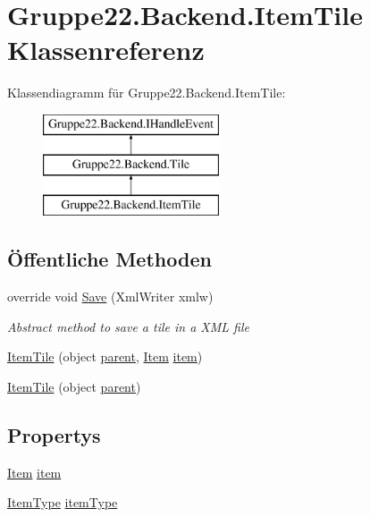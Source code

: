 \hypertarget{class_gruppe22_1_1_backend_1_1_item_tile}{\section{Gruppe22.\-Backend.\-Item\-Tile Klassenreferenz}
\label{class_gruppe22_1_1_backend_1_1_item_tile}
}
Klassendiagramm für Gruppe22.\-Backend.\-Item\-Tile\-:\begin{figure}[H]
\begin{center}
\leavevmode
\includegraphics[height=3.000000cm]{class_gruppe22_1_1_backend_1_1_item_tile}
\end{center}
\end{figure}
\subsection*{Öffentliche Methoden}
\begin{DoxyCompactItemize}
\item 
override void \hyperlink{class_gruppe22_1_1_backend_1_1_item_tile_a2e58e18ae35c42b311fcdaa1664ec505}{Save} (Xml\-Writer xmlw)
\begin{DoxyCompactList}\small\item\em Abstract method to save a tile in a X\-M\-L file \end{DoxyCompactList}\item 
\hyperlink{class_gruppe22_1_1_backend_1_1_item_tile_a7975720b4b34cb910403f8ead9caae56}{Item\-Tile} (object \hyperlink{class_gruppe22_1_1_backend_1_1_tile_abc12933c70eb3a2ebbb2fde9f45c2632}{parent}, \hyperlink{class_gruppe22_1_1_backend_1_1_item}{Item} \hyperlink{class_gruppe22_1_1_backend_1_1_item_tile_a1c70024d6768af2fbeeb988fc14838be}{item})
\item 
\hyperlink{class_gruppe22_1_1_backend_1_1_item_tile_a0fd464405cb497015bee896ab1d389d8}{Item\-Tile} (object \hyperlink{class_gruppe22_1_1_backend_1_1_tile_abc12933c70eb3a2ebbb2fde9f45c2632}{parent})
\end{DoxyCompactItemize}
\subsection*{Propertys}
\begin{DoxyCompactItemize}
\item 
\hyperlink{class_gruppe22_1_1_backend_1_1_item}{Item} \hyperlink{class_gruppe22_1_1_backend_1_1_item_tile_a1c70024d6768af2fbeeb988fc14838be}{item}
\item 
\hyperlink{namespace_gruppe22_1_1_backend_ad9b2305e9d47cf46b34e082657cc5504}{Item\-Type} \hyperlink{class_gruppe22_1_1_backend_1_1_item_tile_a2bda4d14a172ae8b2b7c66c9d2b67c85}{item\-Type}
\end{DoxyCompactItemize}
